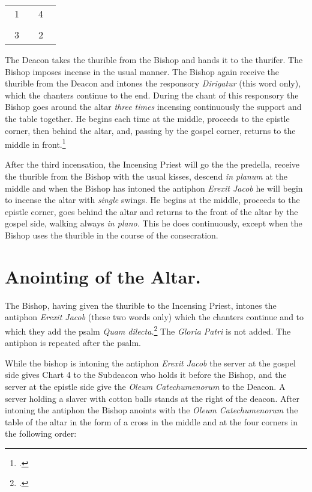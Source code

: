 \documentclass[letterpaper]{report}
\newcommand\crossplan{
\begin{center}
    \begin{tabular}{ | l c r | }
       \hline
        \cross\ {\small 1} &        & {\small 4} \cross\ \\
                           & \cross &           \\
        \cross\ {\small 3} &        & {\small 2} \cross\ \\
       \hline
   \end{tabular} 
\end{center}
}
\begin{document}
{\crossplan

\rubric The Deacon takes the thurible from the Bishop and hands it to the
thurifer. The Bishop imposes incense in the usual manner. The Bishop again
receive the thurible from the Deacon and intones the responsory
\textit{Dirigatur} (this word only), which the chanters continue to the end.
During the chant of this responsory the Bishop goes around the altar
\textit{three times} incensing continuously the support and the table together.
He begins each time at the middle, proceeds to the epistle corner, then behind
the altar, and, passing by the gospel corner, returns to the middle in
front.\footcite[If the back of the altar is attached to the wall, he begins at
the middle, incenses the support as fas as the epistle corner, afterwards the
table from the epistle to the gospel side, then the side of the altar at the
gospel side, then the side of the altar at the gospel corner and finally the
support from the gospel corner to the middle.][footnote 1, p. 96.]{consecranda}

\rubric After the third incensation, the Incensing Priest will go the the
predella, receive the thurible from the Bishop with the usual kisses, descend
\textit{in planum} at the middle and when the Bishop has intoned the antiphon
\textit{Erexit Jacob} he will begin to incense the altar with \textit{single}
swings. He begins at the middle, proceeds to the epistle corner, goes behind
the altar and returns to the front of the altar by the gospel side, walking
always \textit{in plano.} This he does continuously, except when the Bishop
uses the thurible in the course of the consecration.

\section{Anointing of the Altar.}

\rubric The Bishop, having given the thurible to the Incensing Priest, intones
the antiphon \textit{Erexit Jacob} (these two words only) which the chanters
continue and to which they add the psalm \textit{Quam dilecta.}\footcite[The
rubric appplied to psalm 42 above applied here as well.]{consecranda} The
\textit{Gloria Patri} is not added. The antiphon is repeated after the psalm.

\rubric While the bishop is intoning the antiphon \textit{Erexit Jacob} the
server at the gospel side gives Chart 4 to the Subdeacon who holds it before
the Bishop, and the server at the epistle side give the \textit{Oleum
Catechumenorum} to the Deacon. A server holding a slaver with cotton balls
stands at the right of the deacon. After intoning the antiphon the Bishop
anoints with the \textit{Oleum Catechumenorum} the table of the altar in the
form of a cross in the middle and at the four corners in the following order:

}
\end{document}
